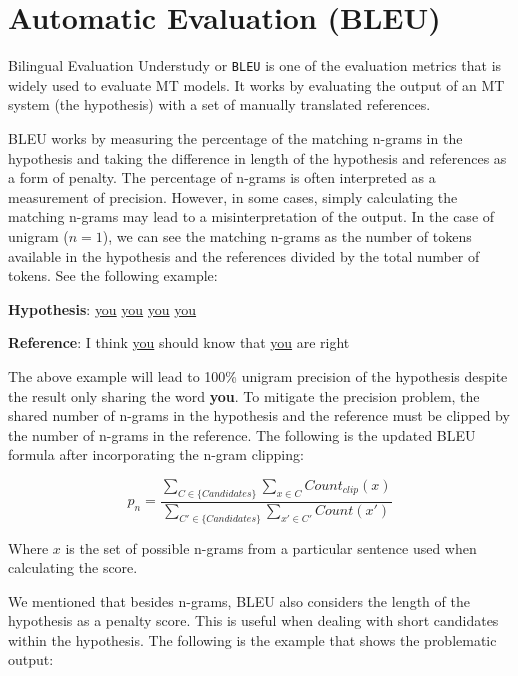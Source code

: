 \clearpage
\section{Automatic Evaluation (BLEU)}
\label{sec:aeval}
Bilingual Evaluation Understudy or \texttt{BLEU}  is one of the evaluation metrics that is widely used to evaluate MT models. It works by evaluating the output of an MT system (the hypothesis) with a set of manually translated references.

BLEU works by measuring the percentage of the matching n-grams in the hypothesis and taking the difference in length of the hypothesis and references as a form of penalty. The percentage of n-grams is often interpreted as a measurement of precision. However, in some cases, simply calculating the matching n-grams may lead to a misinterpretation of the output. In the case of unigram ($n=1$), we can see the matching n-grams as the number of tokens available in the hypothesis and the references divided by the total number of tokens. See the following example:

\bigskip

\textbf{Hypothesis}: \underline{you} \underline{you} \underline{you} \underline{you}

\textbf{Reference}: I think \underline{you} should know that \underline{you} are right

\bigskip

The above example will lead to 100\% unigram precision of the hypothesis despite the result only sharing the word \textbf{you}. To mitigate the precision problem, the shared number of n-grams in the hypothesis and the reference must be clipped by the number of n-grams in the reference. The following is the updated BLEU formula after incorporating the n-gram clipping:

\begin{equation}
    p_n=\frac{\sum_{C\in\{Candidates\}}\sum_{x\in C}Count_{clip}(x)}{\sum_{C'\in\{Candidates\}}\sum_{x'\in C'}Count(x')}
\end{equation}

Where $x$ is the set of possible n-grams from a particular sentence used when calculating the score.

We mentioned that besides n-grams, BLEU also considers the length of the hypothesis as a penalty score. This is useful when dealing with short candidates within the hypothesis. The following is the example that shows the problematic output:

\bigskip

